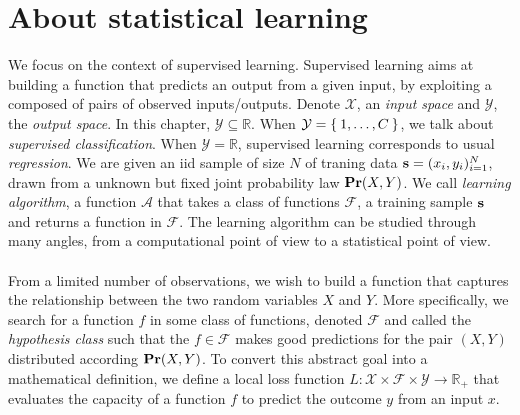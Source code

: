 
\section{About statistical learning}
\label{sec:about_statistical_learning}
We focus on the context of supervised learning. Supervised learning aims at
building a function that predicts an output from a given input, by exploiting a
 composed of pairs of observed inputs/outputs. Denote
$\mathcal{X}$, an \emph{input space} and $\mathcal{Y}$, the \emph{output
space}.  In this chapter, $\mathcal{Y} \subseteq \mathbb{R}$. When
$\mathcal{Y}=\Set{1, \ldots, C}$, we talk about \emph{supervised
classification}.  When $\mathcal{Y}=\mathbb{R}$, supervised learning
corresponds to  usual \emph{regression}. We are given an \acf{iid} sample of
size $N$ of traning data $\boldsymbol{\mathbf{s}}=(x_i, y_i)_{i=1}^N$, drawn from a unknown but
fixed joint probability law ${\mathbf{{Pr}}}(X,Y)$. We call \emph{learning
algorithm}, a function $\mathcal{A}$ that takes a class of functions
$\mathcal{F}$, a training sample $\boldsymbol{\mathbf{s}}$ and returns a function in
$\mathcal{F}$. The learning algorithm can be studied through many angles, from
a computational point of view to a statistical point of view.
\paragraph{}
From a limited number of observations, we wish to build a function that
captures the relationship between the two random variables $X$ and $Y$. More
specifically, we search for a function $f$ in some class of functions, denoted
$\mathcal{F}$ and called the \emph{hypothesis class} such that the
$f\in\mathcal{F}$ makes good predictions for the pair $(X,Y)$ distributed
according ${\mathbf{{Pr}}}(X,Y)$. To convert this abstract goal into a
mathematical definition, we define a local loss function
$L:\mathcal{X}\times\mathcal{F}\times\mathcal{Y} \to \mathbb{R}_+$ that
evaluates the capacity of a function $f$ to predict the outcome $y$ from an
input $x$.
